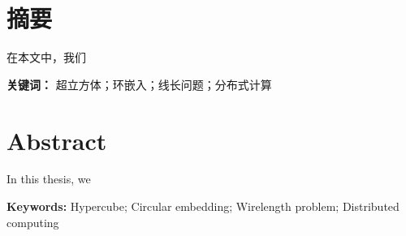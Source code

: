 
\chapter*{摘要}
\label{Abstract CN}

在本文中，我们
\hfill\break

\textbf{关键词：} 超立方体；环嵌入；线长问题；分布式计算

\chapter*{Abstract}
\label{Abstract EN}

In this thesis, we
\hfill\break

\textbf{Keywords:} Hypercube; Circular embedding; Wirelength problem;
Distributed computing
